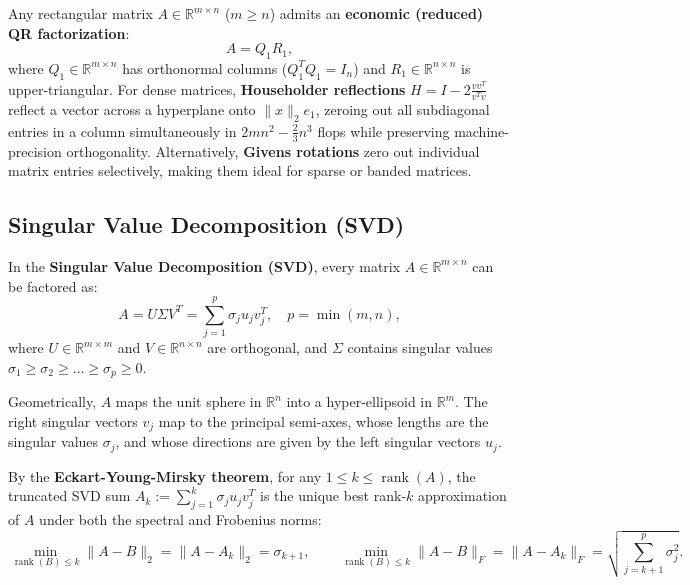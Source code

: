 Any rectangular matrix $A \in \mathbb{R}^{m \times n}$ ($m \ge n$) admits an \textbf{economic (reduced) QR factorization}:
\begin{equation}
    A = Q_1 R_1,
\end{equation}
where $Q_1 \in \mathbb{R}^{m \times n}$ has orthonormal columns ($Q_1^T Q_1 = I_n$) and $R_1 \in \mathbb{R}^{n \times n}$ is upper-triangular. For dense matrices, \textbf{Householder reflections} $H = I - 2 \frac{v v^T}{v^T v}$ reflect a vector across a hyperplane onto $\|x\|_2 e_1$, zeroing out all subdiagonal entries in a column simultaneously in $2m n^2 - \frac{2}{3}n^3$ flops while preserving machine-precision orthogonality. Alternatively, \textbf{Givens rotations} zero out individual matrix entries selectively, making them ideal for sparse or banded matrices.

\subsection{Singular Value Decomposition (SVD)}

\begin{theorem}
    In the \textbf{Singular Value Decomposition (SVD)}, every matrix $A \in \mathbb{R}^{m \times n}$ can be factored as:
    \begin{equation}
        A = U \Sigma V^T = \sum_{j=1}^{p} \sigma_j u_j v_j^T, \quad p = \min(m, n),
    \end{equation}
    where $U \in \mathbb{R}^{m \times m}$ and $V \in \mathbb{R}^{n \times n}$ are orthogonal, and $\Sigma$ contains singular values $\sigma_1 \ge \sigma_2 \ge \dots \ge \sigma_p \ge 0$.
\end{theorem}

Geometrically, $A$ maps the unit sphere in $\mathbb{R}^n$ into a hyper-ellipsoid in $\mathbb{R}^m$. The right singular vectors $v_j$ map to the principal semi-axes, whose lengths are the singular values $\sigma_j$, and whose directions are given by the left singular vectors $u_j$.

\begin{theorem}
    By the \textbf{Eckart-Young-Mirsky theorem}, for any $1 \le k \le \operatorname{rank}(A)$, the truncated SVD sum $A_k := \sum_{j=1}^{k} \sigma_j u_j v_j^T$ is the unique best rank-$k$ approximation of $A$ under both the spectral and Frobenius norms:
    \begin{equation}
        \min_{\operatorname{rank}(B) \le k} \|A - B\|_2 = \|A - A_k\|_2 = \sigma_{k+1}, \qquad \min_{\operatorname{rank}(B) \le k} \|A - B\|_F = \|A - A_k\|_F = \sqrt{\sum_{j=k+1}^{p} \sigma_j^2}.
    \end{equation}
\end{theorem}

